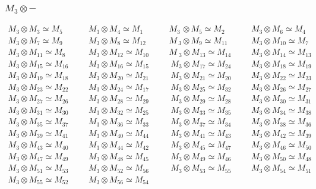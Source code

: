 \subsubsection{$M_3\otimes -$}
\begin{align*}
M_{3} \otimes M_{3} \simeq M_{5} &&& M_{3} \otimes M_{4} \simeq M_{1} &&& M_{3\
} \otimes M_{5} \simeq M_{2} &&& M_{3} \otimes M_{6} \simeq M_{4}\\
M_{3} \otimes M_{7} \simeq M_{9} &&& M_{3} \otimes M_{8} \simeq M_{12} &&& M_{\
3} \otimes M_{9} \simeq M_{11} &&& M_{3} \otimes M_{10} \simeq M_{7}\\
M_{3} \otimes M_{11} \simeq M_{8} &&& M_{3} \otimes M_{12} \simeq M_{10} &&& M\
_{3} \otimes M_{13} \simeq M_{14} &&& M_{3} \otimes M_{14} \simeq M_{13}\\
M_{3} \otimes M_{15} \simeq M_{16} &&& M_{3} \otimes M_{16} \simeq M_{15} &&& \
M_{3} \otimes M_{17} \simeq M_{24} &&& M_{3} \otimes M_{18} \simeq M_{19}\\
M_{3} \otimes M_{19} \simeq M_{18} &&& M_{3} \otimes M_{20} \simeq M_{21} &&& \
M_{3} \otimes M_{21} \simeq M_{20} &&& M_{3} \otimes M_{22} \simeq M_{23}\\
M_{3} \otimes M_{23} \simeq M_{22} &&& M_{3} \otimes M_{24} \simeq M_{17} &&& \
M_{3} \otimes M_{25} \simeq M_{32} &&& M_{3} \otimes M_{26} \simeq M_{27}\\
M_{3} \otimes M_{27} \simeq M_{26} &&& M_{3} \otimes M_{28} \simeq M_{29} &&& \
M_{3} \otimes M_{29} \simeq M_{28} &&& M_{3} \otimes M_{30} \simeq M_{31}\\
M_{3} \otimes M_{31} \simeq M_{30} &&& M_{3} \otimes M_{32} \simeq M_{25} &&& \
M_{3} \otimes M_{33} \simeq M_{35} &&& M_{3} \otimes M_{34} \simeq M_{38}\\
M_{3} \otimes M_{35} \simeq M_{37} &&& M_{3} \otimes M_{36} \simeq M_{33} &&& \
M_{3} \otimes M_{37} \simeq M_{34} &&& M_{3} \otimes M_{38} \simeq M_{36}\\
M_{3} \otimes M_{39} \simeq M_{41} &&& M_{3} \otimes M_{40} \simeq M_{44} &&& \
M_{3} \otimes M_{41} \simeq M_{43} &&& M_{3} \otimes M_{42} \simeq M_{39}\\
M_{3} \otimes M_{43} \simeq M_{40} &&& M_{3} \otimes M_{44} \simeq M_{42} &&& \
M_{3} \otimes M_{45} \simeq M_{47} &&& M_{3} \otimes M_{46} \simeq M_{50}\\
M_{3} \otimes M_{47} \simeq M_{49} &&& M_{3} \otimes M_{48} \simeq M_{45} &&& \
M_{3} \otimes M_{49} \simeq M_{46} &&& M_{3} \otimes M_{50} \simeq M_{48}\\
M_{3} \otimes M_{51} \simeq M_{53} &&& M_{3} \otimes M_{52} \simeq M_{56} &&& \
M_{3} \otimes M_{53} \simeq M_{55} &&& M_{3} \otimes M_{54} \simeq M_{51}\\
M_{3} \otimes M_{55} \simeq M_{52} &&& M_{3} \otimes M_{56} \simeq M_{54}\\
\end{align*}


